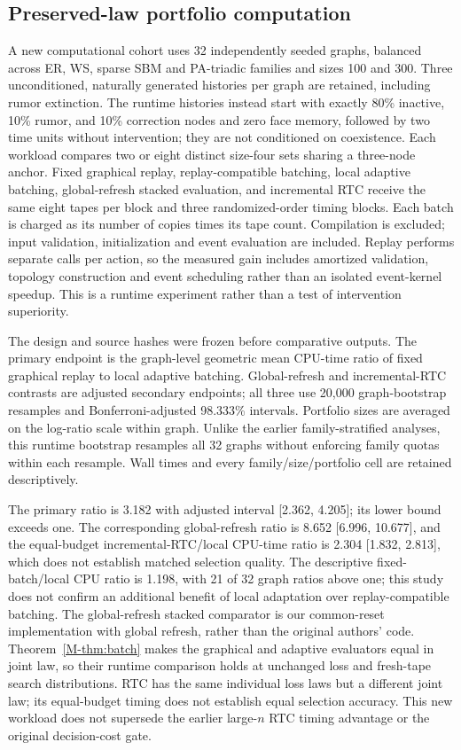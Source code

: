 \documentclass[preprint,11pt,sort&compress]{elsarticle}
\begin{document}
\subsection{Preserved-law portfolio computation}
A new computational cohort uses 32 independently seeded graphs, balanced across ER, WS, sparse SBM and PA-triadic families and sizes 100 and 300. Three unconditioned, naturally generated histories per graph are retained, including rumor extinction. The runtime histories instead start with exactly 80\% inactive, 10\% rumor, and 10\% correction nodes and zero face memory, followed by two time units without intervention; they are not conditioned on coexistence. Each workload compares two or eight distinct size-four sets sharing a three-node anchor. Fixed graphical replay, replay-compatible batching, local adaptive batching, global-refresh stacked evaluation, and incremental RTC receive the same eight tapes per block and three randomized-order timing blocks. Each batch is charged as its number of copies times its tape count. Compilation is excluded; input validation, initialization and event evaluation are included. Replay performs separate calls per action, so the measured gain includes amortized validation, topology construction and event scheduling rather than an isolated event-kernel speedup. This is a runtime experiment rather than a test of intervention superiority.

The design and source hashes were frozen before comparative outputs. The primary endpoint is the graph-level geometric mean CPU-time ratio of fixed graphical replay to local adaptive batching. Global-refresh and incremental-RTC contrasts are adjusted secondary endpoints; all three use 20,000 graph-bootstrap resamples and Bonferroni-adjusted 98.333\% intervals. Portfolio sizes are averaged on the log-ratio scale within graph. Unlike the earlier family-stratified analyses, this runtime bootstrap resamples all 32 graphs without enforcing family quotas within each resample. Wall times and every family/size/portfolio cell are retained descriptively.

The primary ratio is 3.182 with adjusted interval [2.362, 4.205]; its lower bound exceeds one. The corresponding global-refresh ratio is 8.652 [6.996, 10.677], and the equal-budget incremental-RTC/local CPU-time ratio is 2.304 [1.832, 2.813], which does not establish matched selection quality. The descriptive fixed-batch/local CPU ratio is 1.198, with 21 of 32 graph ratios above one; this study does not confirm an additional benefit of local adaptation over replay-compatible batching. The global-refresh stacked comparator is our common-reset implementation with global refresh, rather than the original authors' code. Theorem~\ref{M-thm:batch} makes the graphical and adaptive evaluators equal in joint law, so their runtime comparison holds at unchanged loss and fresh-tape search distributions. RTC has the same individual loss laws but a different joint law; its equal-budget timing does not establish equal selection accuracy. This new workload does not supersede the earlier large-$n$ RTC timing advantage or the original decision-cost gate.
\end{document}
